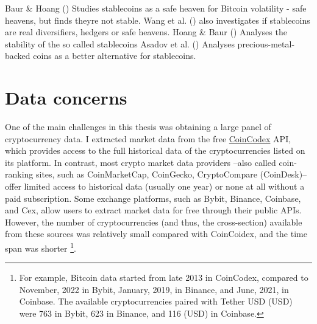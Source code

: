 \documentclass[
  12pt,
  a4paper,
  openany]{scrbook}
\begin{document}
Baur \& Hoang () Studies
stablecoins as a safe heaven for Bitcoin volatility - safe heavens, but
finds theyre not stable. Wang et al.
() also investigates if
stablecoins are real diversifiers, hedgers or safe heavens. Hoang \&
Baur () Analyses the stability of
the so called stablecoins Asadov et al.
() Analyses
precious-metal-backed coins as a better alternative for stablecoins.

\section{Data concerns}\label{data-concerns}

One of the main challenges in this thesis was obtaining a large panel of
cryptocurrency data. I extracted market data from the free
\href{https://coincodex.com/}{CoinCodex} API, which provides access to
the full historical data of the cryptocurrencies listed on its platform.
In contrast, most crypto market data providers --also called
coin-ranking sites, such as CoinMarketCap, CoinGecko, CryptoCompare
(CoinDesk)-- offer limited access to historical data (usually one year)
or none at all without a paid subscription. Some exchange platforms,
such as Bybit, Binance, Coinbase, and Cex, allow users to extract market
data for free through their public APIs. However, the number of
cryptocurrencies (and thus, the cross-section) available from these
sources was relatively small compared with CoinCoidex, and the time span
was shorter \footnote{For example, Bitcoin data started from late 2013
  in CoinCodex, compared to November, 2022 in Bybit, January, 2019, in
  Binance, and June, 2021, in Coinbase. The available cryptocurrencies
  paired with Tether USD (USD) were 763 in Bybit, 623 in Binance, and
  116 (USD) in Coinbase.}.
\end{document}

